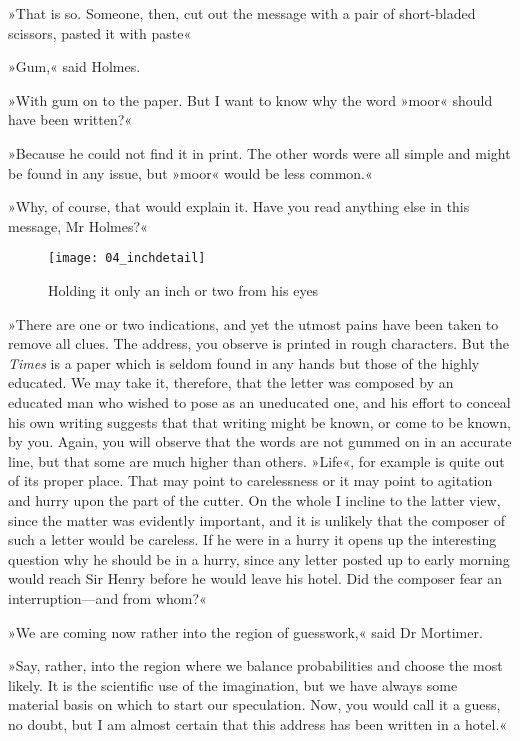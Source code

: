 »That is so. Someone, then, cut out the message with a pair of short-bladed scissors, pasted it with paste\longdash «

»Gum,« said Holmes.

»With gum on to the paper. But I want to know why the word »moor« should have been written?«

»Because he could not find it in print. The other words were all simple and might be found in any issue, but »moor« would be less common.«

»Why, of course, that would explain it. Have you read anything else in this message, Mr Holmes?«

\begin{figure}[tbhp]
\centering
\texttt{[image: 04\_inchdetail]}
\caption{Holding it only an inch or two from his eyes}
\end{figure}

»There are one or two indications, and yet the utmost pains have been taken to remove all clues. The address, you observe is printed in rough characters. But the \textit{Times} is a paper which is seldom found in any hands but those of the highly educated. We may take it, therefore, that the letter was composed by an educated man who wished to pose as an uneducated one, and his effort to conceal his own writing suggests that that writing might be known, or come to be known, by you. Again, you will observe that the words are not gummed on in an accurate line, but that some are much higher than others. »Life«, for example is quite out of its proper place. That may point to carelessness or it may point to agitation and hurry upon the part of the cutter. On the whole I incline to the latter view, since the matter was evidently important, and it is unlikely that the composer of such a letter would be careless. If he were in a hurry it opens up the interesting question why he should be in a hurry, since any letter posted up to early morning would reach Sir Henry before he would leave his hotel. Did the composer fear an interruption\allowbreak---\allowbreak and from whom?«

»We are coming now rather into the region of guesswork,« said Dr Mortimer.

»Say, rather, into the region where we balance probabilities and choose the most likely. It is the scientific use of the imagination, but we have always some material basis on which to start our speculation. Now, you would call it a guess, no doubt, but I am almost certain that this address has been written in a hotel.«

